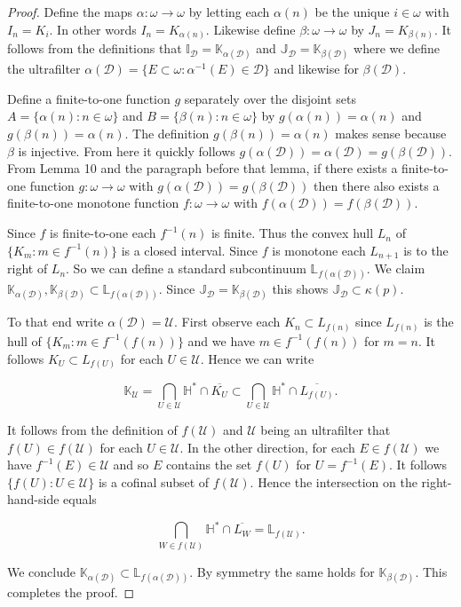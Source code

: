 \documentclass[12pt]{article}
\theoremstyle{plain}
\theoremstyle{definition}
\newcounter{claim5counter}
\newcommand{\A}{\ensuremath{\alpha}}
\newcommand{\K}{\ensuremath{\kappa}}
\newcommand{\B}{\ensuremath{\beta}}
\newcommand{\W}{\ensuremath{\omega}}
\newcommand{\II}{\ensuremath{\mathbb I}}
\newcommand{\KK}{\ensuremath{\mathbb K}}
\newcommand{\JJ}{\ensuremath{\mathbb J}}
\newcommand{\LL}{\ensuremath{\mathbb L}}
\newcommand{\HH}{\ensuremath{\mathbb H}}
\newcommand{\0}{\ensuremath{\varnothing}}
\newcommand{\cD}{\ensuremath{\mathcal D}}
\newcommand{\cU}{\ensuremath{\mathcal U}}
\begin{document}
\begin{proof}
Define the maps $\A: \W \to \W$ by letting each $\A(n)$ be the unique $i \in \W$ with $I_n = K_i$. In other words $I_n = K_{\A(n)}$. Likewise define $\B: \W \to \W$ by $J_n = K_{\B(n)}$. It follows from the definitions that $\II_\cD = \mathbb K _{\A(\cD)}$ and $\JJ_\cD = \mathbb K _{\B(\cD)}$ where we define the ultrafilter $\A(\cD) = \{E \subset \W: \A^{-1}(E) \in \cD\}$ and likewise for $\B(\cD)$. 

Define a finite-to-one function $g$ separately over the disjoint sets $A= \{\A(n): n \in \W\}$ and $B= \{\B(n): n \in \W\}$ by $g(\A(n))= \A(n)$ and $g(\B(n))= \A(n)$. The definition $g(\B(n))= \A(n)$ makes sense because $\B$ is injective. From here it quickly follows $g(\A(\cD)) = \A(\cD) = g(\B(\cD))$. 	
From \cite{NCF1} Lemma 10 and the paragraph before that lemma, if there exists a finite-to-one function \mbox{$g: \W \to \W$} with $g(\A(\cD)) = g(\B(\cD))$ then there also exists a finite-to-one monotone function $f: \W \to \W$ with $f(\A(\cD)) = f(\B(\cD))$. 

Since $f$ is finite-to-one each $f^{-1}(n)$ is finite. Thus the convex hull $L_n$ of $\{K_m: m \in f^{-1}(n)\}$ is a closed interval. Since $f$ is monotone each $L_{n+1}$ is to the right of $L_n$. So we can define a standard subcontinuum $\LL_{f(\A(\cD))}$. We claim  $\KK_{\A(\cD)},\KK_{\B(\cD)} \subset \LL_{f(\A(\cD))}$. Since $\JJ_\cD = \KK_{\B(\cD)}$ this shows $\JJ_\cD  \subset \K(p)$.

To that end write $\A(\cD) = \cU$. First observe each $K_n \subset L_{f(n)}$ since $L_{f(n)}$ is the hull of $\{K_m: m \in f^{-1}(f(n))\}$ and we have $m \in f^{-1}(f(n))$ for $m=n$.  It follows $K_U \subset L_{f(U)}$ for each $U \in \cU$. Hence we can write



$$\KK_\cU = \bigcap_{U \in \cU} \HH^* \cap \overline{K_U} \subset \bigcap_{U \in \cU} \HH^* \cap \overline{L_{f(U)}}.$$

It follows from the definition of $f(\cU)$ and $\cU$ being an ultrafilter that $f(U) \in f(\cU)$ for each $U \in \cU$. In the other direction, for each $E \in f(\cU)$ we have $f^{-1}(E) \in \cU$ and so $E$ contains the set $f(U)$ for $U = f^{-1}(E)$. It follows $\{f(U): U \in \cU\}$ is a cofinal subset of $f(\cU)$. Hence the intersection on the right-hand-side equals

$$\bigcap_{W \in f(\cU)} \HH^* \cap \overline{L_{W}} = \LL_{f(\cU)}.$$

We conclude $\KK_{\A(\cD)} \subset \LL_{f(\A(\cD))}$. By symmetry the same holds for $\KK_{\B(\cD)}$. This completes the proof.
\end{proof}
\end{document}
